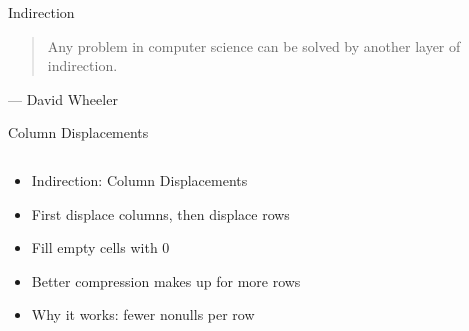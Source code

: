 \begin{frame}{Indirection}
	\begin{quotation}
		Any problem in computer science can be solved by another layer of indirection.
	\end{quotation}
	\vspace*{-1em}
	\begin{flushright}
		\textup{
		--- David Wheeler
		}
	\end{flushright}
\end{frame}

\begin{frame}{Column Displacements}
	\begin{columns}
		\begin{column}[T]{0.6\textwidth}
			\begin{itemize}[<+->]
				\itemspacing{20pt}
				\item Indirection: Column Displacements
				\item First displace columns, then displace rows
				\item Fill empty cells with 0
				\item Better compression makes up for more rows
				\item Why it works: fewer nonulls per row
			\end{itemize}
		\end{column}
		

\end{columns}
\end{frame}
